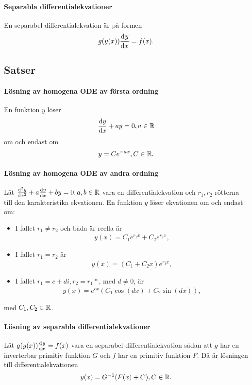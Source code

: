 \paragraph{Separabla differentialekvationer}
En separabel differentialekvation är på formen
\begin{align*}
	g(y(x))\dv[]{y}{x} (x) = f(x).
\end{align*}

\subsection{Satser}

\paragraph{Lösning av homogena ODE av första ordning}
En funktion $y$ löser
\begin{align*}
	\dv{y}{x} + ay = 0, a\in\mathbb{R}
\end{align*}
om och endast om
\begin{align*}
	y = Ce^{-ax}, C\in\mathbb{R}.
\end{align*}

\proof

\paragraph{Lösning av homogena ODE av andra ordning}
Låt $\dv[2]{y}{x} + a\dv{y}{x} + by = 0, a, b\in\mathbb{R}$ vara en differentialekvation och $r_1, r_2$ rötterna till den karakteristika ekvationen. En funktion $y$ löser ekvationen om och endast om:
\begin{itemize}
	\item I fallet $r_1\neq r_2$ och båda är reella är
	\begin{align*}
		y(x) = C_1e^{r_1x} + C_2e^{r_2x},
	\end{align*}
	\item I fallet $r_1 = r_2$ är
	\begin{align*}
		y(x) = (C_1 + C_2x)e^{r_1x},
	\end{align*}
	\item I fallet $r_1 = c + di, r_2 = r_1*$, med $d\neq 0$, är
	\begin{align*}
		y(x) = e^{cx}(C_1\cos{(dx)} + C_2\sin{(dx)}),
	\end{align*}
\end{itemize}
med $C_1, C_2\in\mathbb{R}$.

\proof

\paragraph{Lösning av separabla differentialekvationer}
Låt $g(y(x))\dv[]{y}{x} (x) = f(x)$ vara en separabel differentialekvation sådan att $g$ har en inverterbar primitiv funktion $G$ och $f$ har en primitiv funktion $F$. Då är lösningen till differentialekvationen
\begin{align*}
	y(x) = G^{-1}(F(x) + C), C\in\mathbb{R}.
\end{align*}